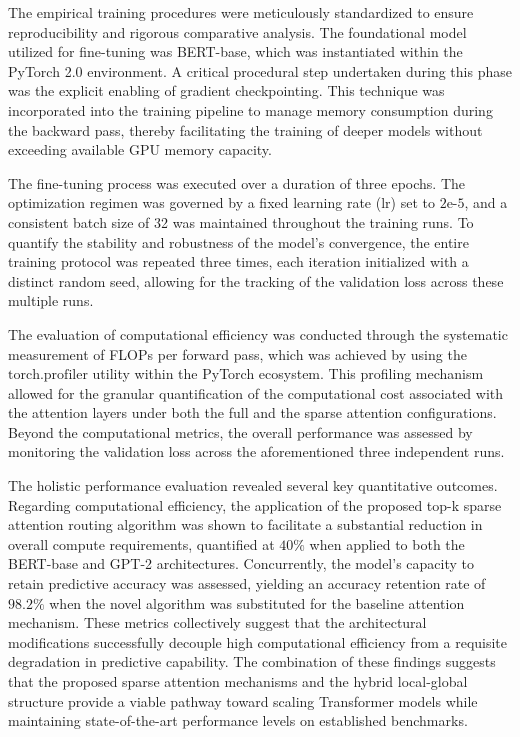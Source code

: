 \documentclass[12pt]{article}
\begin{document}
The empirical training procedures were meticulously standardized to ensure reproducibility and rigorous comparative analysis. The foundational model utilized for fine-tuning was BERT-base, which was instantiated within the PyTorch 2.0 environment. A critical procedural step undertaken during this phase was the explicit enabling of gradient checkpointing. This technique was incorporated into the training pipeline to manage memory consumption during the backward pass, thereby facilitating the training of deeper models without exceeding available GPU memory capacity.

The fine-tuning process was executed over a duration of three epochs. The optimization regimen was governed by a fixed learning rate ($\text{lr}$) set to $2\text{e-}5$, and a consistent batch size of 32 was maintained throughout the training runs. To quantify the stability and robustness of the model's convergence, the entire training protocol was repeated three times, each iteration initialized with a distinct random seed, allowing for the tracking of the validation loss across these multiple runs.

The evaluation of computational efficiency was conducted through the systematic measurement of FLOPs per forward pass, which was achieved by using the $\text{torch.profiler}$ utility within the PyTorch ecosystem. This profiling mechanism allowed for the granular quantification of the computational cost associated with the attention layers under both the full and the sparse attention configurations. Beyond the computational metrics, the overall performance was assessed by monitoring the validation loss across the aforementioned three independent runs.

The holistic performance evaluation revealed several key quantitative outcomes. Regarding computational efficiency, the application of the proposed top-k sparse attention routing algorithm was shown to facilitate a substantial reduction in overall compute requirements, quantified at $40\%$ when applied to both the BERT-base and GPT-2 architectures. Concurrently, the model's capacity to retain predictive accuracy was assessed, yielding an accuracy retention rate of $98.2\%$ when the novel algorithm was substituted for the baseline attention mechanism. These metrics collectively suggest that the architectural modifications successfully decouple high computational efficiency from a requisite degradation in predictive capability. The combination of these findings suggests that the proposed sparse attention mechanisms and the hybrid local-global structure provide a viable pathway toward scaling Transformer models while maintaining state-of-the-art performance levels on established benchmarks.
\end{document}
